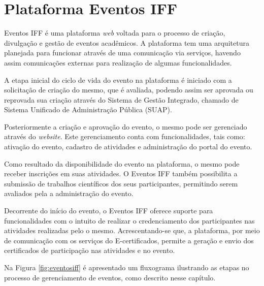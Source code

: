 \chapter{Plataforma Eventos IFF} \label{cap:eventosiff}

Eventos IFF é uma plataforma \textit{web} voltada para o processo de criação, divulgação e gestão de eventos acadêmicos. A plataforma tem uma arquitetura planejada para funcionar através de uma comunicação via serviços, havendo assim comunicações externas para realização de algumas funcionalidades.

A etapa inicial do ciclo de vida do evento na plataforma é iniciado com a solicitação de criação do mesmo, que é avaliada, podendo assim ser aprovada ou reprovada sua criação através do Sistema de Gestão Integrado, chamado de Sistema Unificado de Administração Pública (SUAP).

Posteriormente a criação e aprovação do evento, o mesmo pode ser gerenciado através do \textit{website}. Este gerenciamento conta com funcionalidades, tais como: ativação do evento, cadastro de atividades e administração do portal do evento.

Como resultado da disponibilidade do evento na plataforma, o mesmo pode receber inscrições em suas atividades. O Eventos IFF também possibilita a submissão de trabalhos científicos dos seus participantes, permitindo serem avaliados pela a administração do evento.

Decorrente do início do evento, o Eventos IFF oferece suporte para funcionalidades com o intuito de realizar o credenciamento dos participantes nas atividades realizadas pelo o mesmo. Acrescentando-se que, a plataforma, por meio de comunicação com os serviços do E-certificados, permite a geração e envio dos certificados de participação nas atividades e no evento.

Na Figura \ref{fig:eventosiff} é apresentado um fluxograma ilustrando as etapas no processo de gerenciamento de eventos, como descrito nesse capítulo.

